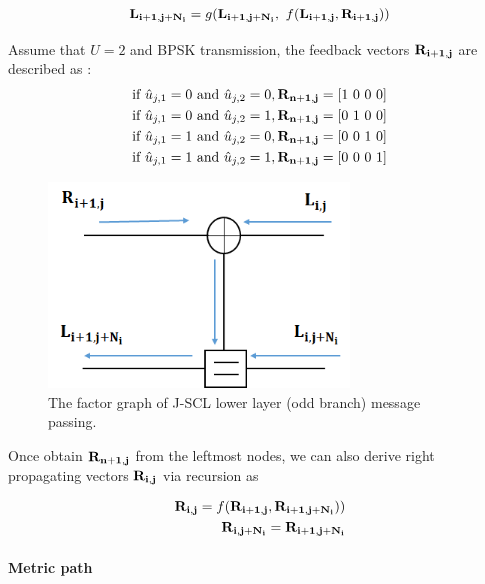 \begin{align}
{\bf{L_{i+1,j+N_i}}} = g( {\bf{L_{i+1,j+N_i}}}, \ f ({\bf{ L_{i+1,j}}} , {\bf{R_{i+1,j}}}) )
\label{equ:scl_even}
\end{align}

Assume that $U=2$ and BPSK transmission, the feedback vectors $\bf R_{i+1,j}$ are described as : 
\begin{align}
\text{if} \  \hat{u}_{j,1}= 0 \ \text{and} \ \hat{u}_{j,2}= 0, {\bf R_{n+1,j}} = {[1 \ 0 \ 0 \ 0]} \nonumber \\
\text{if} \  \hat{u}_{j,1}= 0 \ \text{and} \ \hat{u}_{j,2}= 1, {\bf R_{n+1,j}} = {[0 \ 1 \ 0 \ 0]} \nonumber \\
\text{if} \  \hat{u}_{j,1}= 1 \ \text{and} \ \hat{u}_{j,2}= 0, {\bf R_{n+1,j}} = {[0 \ 0 \ 1 \ 0]} \nonumber \\
\text{if} \  \hat{u}_{j,1}= 1 \ \text{and} \ \hat{u}_{j,2}= 1, {\bf R_{n+1,j}} = {[0 \ 0 \ 0 \ 1]} \nonumber 
\end{align}



\begin{figure}[H]
 \centering
 \includegraphics[width=8cm]{fig/jscl_lowlayer.png}
 \caption{The factor graph of J-SCL lower layer (odd branch) message passing.}
 \label{fig:jscl_lowlayer}
\end{figure}

Once obtain $\bf{R_{n+1,j}}$ from the leftmost nodes, we can also derive right propagating vectors $\bf{R_{i,j}}$ via recursion as

\begin{align}
{\bf{R_{i,j}}} = f ( \bf R_{i+1,j} , R_{i+1,j+N_i}) ) \nonumber  \\
\bf{R_{i,j+N_i}} = R_{i+1,j+N_i}  \nonumber
\end{align}
 

\paragraph{Metric path}


